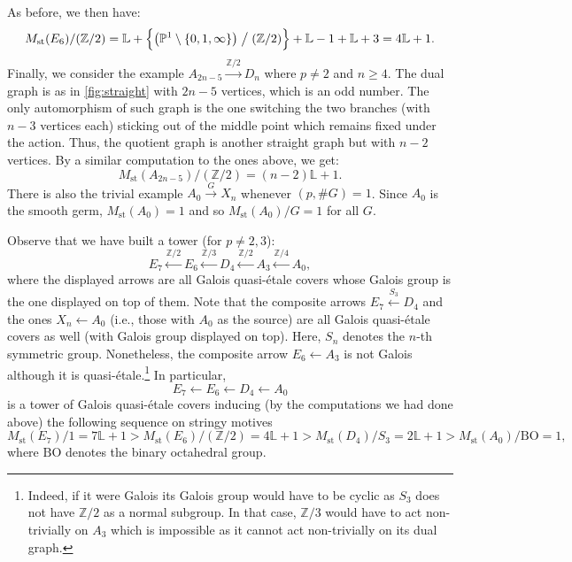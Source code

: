 \documentclass[12pt]{amsart}
\theoremstyle{plain}   %
\theoremstyle{definition}    %
\theoremstyle{remark}    %
\numberwithin{equation}{theorem}
\DeclareMathOperator{\st}{\mathrm{st}}
\newcommand{\bL}{\mathbb{L}}
\newcommand{\bZ}{\mathbb{Z}}
\begin{document}
\begin{example}
As before, we then have:
\[
M_{\mathrm{st}}(E_6)/(\bZ/2) = \bL +  \Bigl\{\bigl(\mathbb{P}^1\setminus \{0,1,\infty\} \bigr)\bigm/{(\bZ/2)}\Bigr\} + \bL-1 + \bL +3 = 4\bL+1.
\]
Finally, we consider the example $A_{2n-5} \xrightarrow{\bZ/2} D_n$ where $p \neq 2$ and $n\geq 4$. The dual graph is as in \autoref{fig:straight} with $2n-5$ vertices, which is an odd number. The only automorphism of such graph is the one switching the two branches (with $n-3$ vertices each) sticking out of the middle point which remains fixed under the action. Thus, the quotient graph is another straight graph but with $n-2$ vertices. By a similar computation to the ones above, we get:
\[
M_{\mathrm{st}}(A_{2n-5})/(\bZ/2) = (n-2) \bL+1.
\]
There is also the trivial example $A_0 \xrightarrow{G} X_n$ whenever $(p,\#G)=1$. Since $A_0$ is the smooth germ, $M_{\st}(A_0)=1$ and so $M_{\st}(A_0)/G = 1$ for all $G$.

Observe that we have built a tower (for $p \neq 2,3$):
\[
E_7 \xleftarrow{\bZ/2} E_6 \xleftarrow{\bZ/3} D_4 \xleftarrow{\bZ/2} A_3 \xleftarrow{\bZ/4} A_0,
\]
where the displayed arrows are all Galois quasi-\'etale covers whose Galois group is the one displayed on top of them. Note that the composite arrows $E_7 \xleftarrow{ S_3 } D_4$ and the ones $X_n \leftarrow A_0$ (i.e., those with $A_0$ as the source) are all Galois quasi-\'etale covers as well (with Galois group displayed on top). Here, $S_n$ denotes the $n$-th symmetric group. Nonetheless, the composite arrow $E_6 \leftarrow A_3$ is not Galois although it is quasi-\'etale.\footnote{Indeed, if it were Galois its Galois group would have to be cyclic as $S_3$ does not have $\bZ/2$ as a normal subgroup. In that case, $\bZ/3$ would have to act non-trivially on $A_3$ which is impossible as it cannot act non-trivially on its dual graph.} In particular,
\[
E_7 \xleftarrow{} E_6 \xleftarrow{} D_4 \leftarrow A_0
\]
is a tower of Galois quasi-\'etale covers inducing (by the computations we had done above) the following sequence on stringy motives
\[
M_{\mathrm{st}}(E_7)/1 = 7 \bL + 1 > M_{\mathrm{st}}(E_6)/(\bZ/2) = 4 \bL+1 > M_{\mathrm{st}}(D_4)/S_3 = 2 \bL+1 > M_{\mathrm{st}}(A_0)/\text{BO} = 1, 
\]
where $\text{BO}$ denotes the binary octahedral group. 
\end{example}
\end{document}
